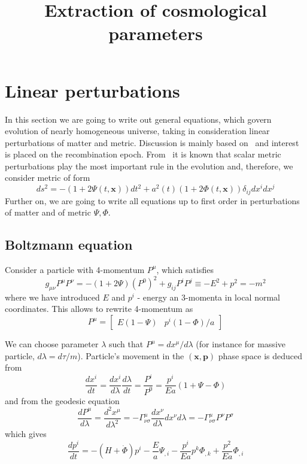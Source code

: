 \documentclass[12pt]{extarticle}
\title{Extraction of cosmological parameters}
\date{}
\numberwithin{problem}{section}
\numberwithin{theorem}{section}
\begin{document}
	\vspace{-3cm}
	\maketitle
	\section{Linear perturbations}
	In this section we are going to write out general equations, which govern evolution of nearly homogeneous universe, taking in consideration linear perturbations of matter and metric. Discussion is mainly based on~\cite{dodelson:2003} and interest is placed on the recombination epoch. From~\cite{gorbunov-rubakov-2:2011} it is known that scalar metric perturbations play the most important rule in the evolution and, therefore, we consider metric of form
	\begin{equation}
		\label{eq:perturb:metric}
		ds^2 = -(1 + 2\Psi(t, \mathbf{x}))dt^2 + a^2(t)(1 + 2\Phi(t, \mathbf{x}))\delta_{ij}dx^idx^j	
	\end{equation}
	Further on, we are going to write all equations up to first order in perturbations of matter and of metric $\Psi, \Phi$.
	
	\subsection{Boltzmann equation}
	Consider a particle with 4-momentum $P^\mu$, which satisfies 
	\begin{equation}
		g_{\mu\nu} P^\mu P^\nu = -(1 + 2\Psi)(P^0)^2 + g_{ij}P^iP^j \equiv -E^2 + p^2 = -m^2
	\end{equation}
	where we have introduced $E$ and $p^i$ - energy an 3-momenta in local normal coordinates. This allows to rewrite 4-momentum as 
	\begin{equation}
		\label{eq:4-momentum}
		P^\mu = \begin{bmatrix}
			E(1 - \Psi) & p^i(1 - \Phi) / a
		\end{bmatrix}
	\end{equation}
	
	We can choose parameter $\lambda$ such that $P^\mu = dx^\mu/d\lambda$ (for instance for massive particle, $d\lambda = d\tau/m$). Particle's movement in the $(\mathbf{x},\mathbf{p})$ phase space is deduced from
	\begin{equation}
		\label{eq:boltzmann:position}
		\frac{dx^i}{dt} = \frac{dx^i}{d\lambda}\frac{d\lambda}{dt} = \frac{P^i}{P^0} = \frac{p^i}{Ea}(1+\Psi-\Phi)
	\end{equation}
	and from the geodesic equation
	\begin{equation}
		\label{eq:boltzmann:momentum}
		\frac{dP^\mu}{d\lambda} = \frac{d^2x^\mu}{d\lambda^2} = -\Gamma^\mu_{\nu\sigma}\frac{dx^\nu}{d\lambda}{dx^\nu}{d\lambda} = -\Gamma^\mu_{\nu\sigma}P^\nu P^\sigma
	\end{equation}
	which gives
	\begin{equation}
		\frac{dp^i}{dt} = -(H + \dot{\Phi})p^i - \frac{E}{a}\Psi_{,i} - \frac{p^i}{Ea}p^k\Phi_{,k} + \frac{p^2}{Ea}\Phi_{,i}
	\end{equation}
\end{document}
